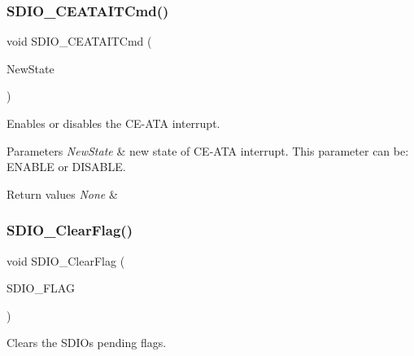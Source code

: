 \subsubsection{\texorpdfstring{SDIO\_CEATAITCmd()}{SDIO\_CEATAITCmd()}}
{\footnotesize\ttfamily void S\+D\+I\+O\+\_\+\+C\+E\+A\+T\+A\+I\+T\+Cmd (\begin{DoxyParamCaption}\item[{\mbox{\hyperlink{group___exported__types_gac9a7e9a35d2513ec15c3b537aaa4fba1}{Functional\+State}}}]{New\+State }\end{DoxyParamCaption})}



Enables or disables the C\+E-\/\+A\+TA interrupt. 


\begin{DoxyParams}{Parameters}
{\em New\+State} & new state of C\+E-\/\+A\+TA interrupt. This parameter can be\+: E\+N\+A\+B\+LE or D\+I\+S\+A\+B\+LE. \\
\hline
\end{DoxyParams}

\begin{DoxyRetVals}{Return values}
{\em None} & \\
\hline
\end{DoxyRetVals}
\mbox{\label{group___s_d_i_o___exported___functions_ga7aff4efdeb528229135f9f285e53518a}} 
\subsubsection{\texorpdfstring{SDIO\_ClearFlag()}{SDIO\_ClearFlag()}}
{\footnotesize\ttfamily void S\+D\+I\+O\+\_\+\+Clear\+Flag (\begin{DoxyParamCaption}\item[{uint32\+\_\+t}]{S\+D\+I\+O\+\_\+\+F\+L\+AG }\end{DoxyParamCaption})}



Clears the S\+D\+IO\textquotesingle{}s pending flags. 



